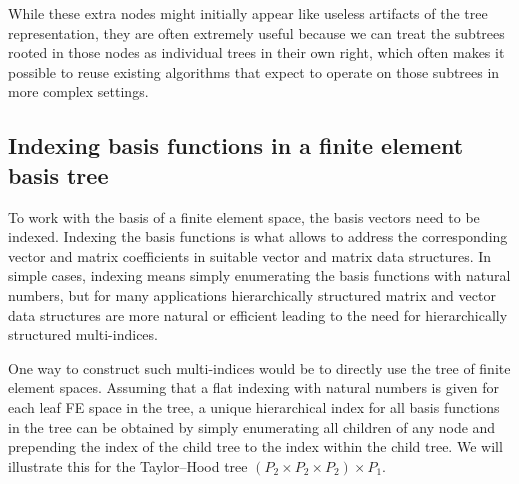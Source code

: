 \documentclass[a4paper,10pt,headings=normal,bibliography=totoc]{scrartcl}
\begin{document}

While these extra nodes might initially appear like useless artifacts of the tree representation, they are often extremely useful
because we can treat the subtrees rooted in those nodes as individual trees in their own right, which often makes it possible to
reuse existing algorithms that expect to operate on those subtrees in more complex settings.




\subsection{Indexing basis functions in a finite element basis tree}
\label{sec:dune_functions:basis_ordering}

To work with the basis of a finite element space, the basis vectors need to be indexed.  Indexing the basis functions
is what allows to address the corresponding vector and matrix coefficients in suitable vector and matrix data structures.
In simple cases, indexing means simply enumerating the basis functions with natural numbers, but for many applications
hierarchically structured matrix and vector data structures are more natural or efficient leading to the need
for hierarchically structured multi-indices.

One way to construct such multi-indices would be to directly use the tree of finite element spaces.
Assuming that a flat indexing with natural numbers is given for each leaf FE space in the tree,
a unique hierarchical index for all basis functions in the tree can be obtained by simply
enumerating all children of any node and prepending the index of the child tree to the index
within the child tree.
We will illustrate this for the Taylor--Hood tree $(P_2 \times P_2 \times P_2) \times P_1$.
\end{document}
